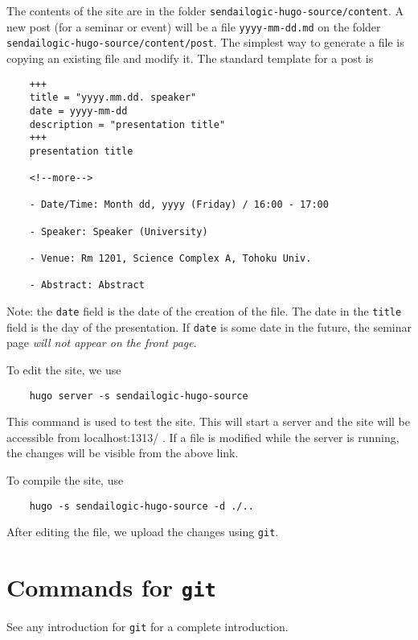 \documentclass[a4paper]{article}
\begin{document}
The contents of the site are in the folder \texttt{sendailogic-hugo-source/content}.
A new post (for a seminar or event) will be a file \texttt{yyyy-mm-dd.md} on the folder \texttt{sendailogic-hugo-source/content/post}.
The simplest way to generate a file is copying an existing file and modify it.
The standard template for a post is
\begin{verbatim}
    +++
    title = "yyyy.mm.dd. speaker"
    date = yyyy-mm-dd
    description = "presentation title"
    +++
    presentation title

    <!--more-->

    - Date/Time: Month dd, yyyy (Friday) / 16:00 - 17:00

    - Speaker: Speaker (University)

    - Venue: Rm 1201, Science Complex A, Tohoku Univ.

    - Abstract: Abstract
\end{verbatim}
Note: the \texttt{date} field is the date of the creation of the file.
The date in the \texttt{title} field is the day of the presentation.
If \texttt{date} is some date in the future, the seminar page {\em will not appear on the front page}.

To edit the site, we use
\begin{verbatim}
    hugo server -s sendailogic-hugo-source
\end{verbatim}
This command is used to test the site.
This will start a server and the site will be accessible from localhost:1313/ .
If a file is modified while the server is running, the changes will be visible from the above link.

To compile the site, use
\begin{verbatim}
    hugo -s sendailogic-hugo-source -d ./..
\end{verbatim}
After editing the file, we upload the changes using \texttt{git}.

\section{Commands for \texttt{git}}
See any introduction for \texttt{git} for a complete introduction.
\end{document}
